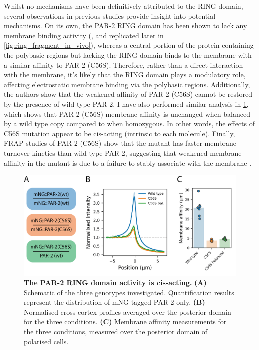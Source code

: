 \documentclass[12pt]{"report"}
\newcommand{\mycaption}[2]{\caption[#1]{\textbf{#1.} #2}}
\begin{document}
Whilst no mechanisms have been definitively attributed to the RING domain, several observations in previous studies provide insight into potential mechanisms. On its own, the PAR-2 RING domain has been shown to lack any membrane binding activity (\textcite{Hao2006}, and replicated later in \cref{fig:ring_fragment_in_vivo}), whereas a central portion of the protein containing the polybasic regions but lacking the RING domain binds to the membrane with a similar affinity to PAR-2 (C56S). Therefore, rather than a direct interaction with the membrane, it’s likely that the RING domain plays a modulatory role, affecting electrostatic membrane binding via the polybasic regions. Additionally, the authors show that the weakened affinity of PAR-2 (C56S) cannot be restored by the presence of wild-type PAR-2. I have also performed similar analysis in \cref{fig:c56s_cis}, which shows that PAR-2 (C56S) membrane affinity is unchanged when balanced by a wild type copy compared to when homozygous. In other words, the effects of C56S mutation appear to be cis-acting (intrinsic to each molecule). Finally, FRAP studies of PAR-2 (C56S) show that the mutant has faster membrane turnover kinetics than wild type PAR-2, suggesting that weakened membrane affinity in the mutant is due to a failure to stably associate with the membrane \citep{Motegi2011}.\\


\begin{figure}
\includegraphics[scale=1]{c56s_cis}
\centering
\mycaption{The PAR-2 RING domain activity is cis-acting}{
\textbf{(A)} Schematic of the three genotypes investigated. Quantification results represent the distribution of mNG-tagged PAR-2 only.
\textbf{(B)} Normalised cross-cortex profiles averaged over the posterior domain for the three conditions. 
\textbf{(C)} Membrane affinity measurements for the three conditions, measured over the posterior domain of polarised cells.
}
\label{fig:c56s_cis}
\end{figure}
\end{document}
